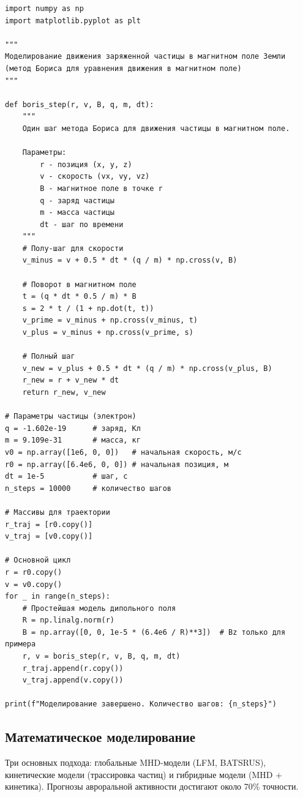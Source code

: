 \begin{verbatim}
import numpy as np
import matplotlib.pyplot as plt

"""
Моделирование движения заряженной частицы в магнитном поле Земли
(метод Бориса для уравнения движения в магнитном поле)
"""

def boris_step(r, v, B, q, m, dt):
    """
    Один шаг метода Бориса для движения частицы в магнитном поле.
    
    Параметры:
        r - позиция (x, y, z)
        v - скорость (vx, vy, vz)
        B - магнитное поле в точке r
        q - заряд частицы
        m - масса частицы
        dt - шаг по времени
    """
    # Полу-шаг для скорости
    v_minus = v + 0.5 * dt * (q / m) * np.cross(v, B)
    
    # Поворот в магнитном поле
    t = (q * dt * 0.5 / m) * B
    s = 2 * t / (1 + np.dot(t, t))
    v_prime = v_minus + np.cross(v_minus, t)
    v_plus = v_minus + np.cross(v_prime, s)
    
    # Полный шаг
    v_new = v_plus + 0.5 * dt * (q / m) * np.cross(v_plus, B)
    r_new = r + v_new * dt
    return r_new, v_new

# Параметры частицы (электрон)
q = -1.602e-19      # заряд, Кл
m = 9.109e-31       # масса, кг
v0 = np.array([1e6, 0, 0])   # начальная скорость, м/с
r0 = np.array([6.4e6, 0, 0]) # начальная позиция, м
dt = 1e-5           # шаг, с
n_steps = 10000     # количество шагов

# Массивы для траектории
r_traj = [r0.copy()]
v_traj = [v0.copy()]

# Основной цикл
r = r0.copy()
v = v0.copy()
for _ in range(n_steps):
    # Простейшая модель дипольного поля
    R = np.linalg.norm(r)
    B = np.array([0, 0, 1e-5 * (6.4e6 / R)**3])  # Bz только для примера
    r, v = boris_step(r, v, B, q, m, dt)
    r_traj.append(r.copy())
    v_traj.append(v.copy())

print(f"Моделирование завершено. Количество шагов: {n_steps}")
\end{verbatim}

\subsection{Математическое моделирование}

Три основных подхода: глобальные MHD-модели (LFM, BATSRUS), кинетические модели (трассировка частиц) и гибридные модели (MHD + кинетика). Прогнозы авроральной активности достигают около 70\% точности.